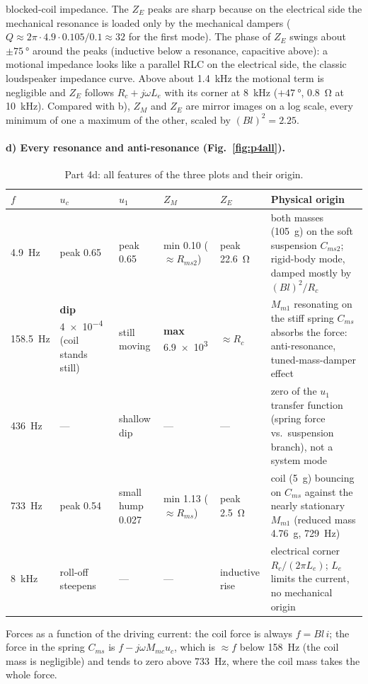 \documentclass[a4paper,11pt]{article}
\newcommand{\jw}{j\omega}
\begin{document}
blocked-coil impedance. The $Z_E$ peaks are sharp because on the electrical side the mechanical resonance is loaded only
by the mechanical dampers ($Q\approx 2\pi\cdot4.9\cdot0.105/0.1\approx32$ for the first mode). The phase of $Z_E$ swings
about $\pm\SI{75}{\degree}$ around the peaks (inductive below a resonance, capacitive above): a motional impedance looks
like a parallel RLC on the electrical side, the classic loudspeaker impedance curve. Above about \SI{1.4}{\kilo\hertz} the
motional term is negligible and $Z_E$ follows $R_c + \jw L_e$ with its corner at \SI{8}{\kilo\hertz}
($+\SI{47}{\degree}$, \SI{0.8}{\ohm} at \SI{10}{\kilo\hertz}). Compared with b), $Z_M$ and $Z_E$ are mirror images on a
log scale, every minimum of one a maximum of the other, scaled by $(Bl)^2 = 2.25$.

\FloatBarrier
\paragraph{d) Every resonance and anti-resonance (Fig.~\ref{fig:p4all}).}
\begin{table}[H]\centering\small
\begin{tabular}{@{}p{1.2cm}p{2.0cm}p{1.8cm}p{2.1cm}p{2.0cm}p{4.9cm}@{}}\toprule
$f$ & $u_c$ & $u_1$ & $Z_M$ & $Z_E$ & Physical origin \\ \midrule
\SI{4.9}{\hertz} & peak 0.65 & peak 0.65 & min 0.10 ($\approx R_{ms2}$) & peak \SI{22.6}{\ohm} & both masses (\SI{105}{\gram}) on the soft suspension $C_{ms2}$; rigid-body mode, damped mostly by $(Bl)^2/R_c$ \\
\SI{158.5}{\hertz} & \textbf{dip} \num{4e-4} (coil stands still) & still moving & \textbf{max} \num{6.9e3} & $\approx R_c$ & $M_{m1}$ resonating on the stiff spring $C_{ms}$ absorbs the force: anti-resonance, tuned-mass-damper effect \\
\SI{436}{\hertz} & --- & shallow dip & --- & --- & zero of the $u_1$ transfer function (spring force vs.\ suspension branch), not a system mode \\
\SI{733}{\hertz} & peak 0.54 & small hump 0.027 & min 1.13 ($\approx R_{ms}$) & peak \SI{2.5}{\ohm} & coil (\SI{5}{\gram}) bouncing on $C_{ms}$ against the nearly stationary $M_{m1}$ (reduced mass \SI{4.76}{\gram}, \SI{729}{\hertz}) \\
\SI{8}{\kilo\hertz} & roll-off steepens & --- & --- & inductive rise & electrical corner $R_c/(2\pi L_e)$; $L_e$ limits the current, no mechanical origin \\
\bottomrule\end{tabular}
\caption{Part 4d: all features of the three plots and their origin.}
\end{table}
Forces as a function of the driving current: the coil force is always $f = Bl\,i$; the force in the spring $C_{ms}$ is
$f - \jw M_{mc}u_c$, which is $\approx f$ below \SI{158}{\hertz} (the coil mass is negligible) and tends to zero above
\SI{733}{\hertz}, where the coil mass takes the whole force.
\end{document}
